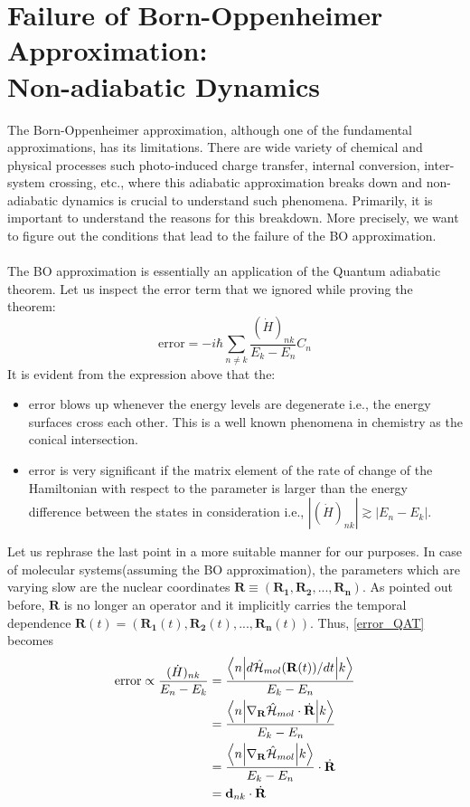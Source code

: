 \section{Failure of Born-Oppenheimer Approximation: \\Non-adiabatic Dynamics}

The Born-Oppenheimer approximation, although one of the fundamental approximations, has its limitations. There are wide variety of chemical and physical processes such photo-induced charge transfer, internal conversion, inter-system crossing, etc., where this adiabatic approximation breaks down and non-adiabatic dynamics is crucial to understand such phenomena. Primarily, it is important to understand the reasons for this breakdown. More precisely, we want to figure out the conditions that lead to the failure of the BO approximation. \\ \\
The BO approximation is essentially an application of the Quantum adiabatic theorem. Let us inspect the error term that we ignored while proving the theorem: 
\begin{equation}\label{error_QAT}
    \text{error} = -i\hbar\sum_{n\neq k}\frac{(\Dot{H})_{nk}}{E_k-E_n}C_n
\end{equation}
It is evident from the expression above that the:
\begin{itemize}
    \item error blows up whenever the energy levels are degenerate i.e., the energy surfaces cross each other. This is a well known phenomena in chemistry as the conical intersection. 
    \item error is very significant if the matrix element of the rate of change of the Hamiltonian with respect to the parameter is larger than the energy difference between the states in consideration i.e., $|(\Dot{H})_{nk}| \gtrsim |E_n - E_k|$. 
\end{itemize}
Let us rephrase the last point in a more suitable manner for our purposes. In case of molecular systems(assuming the BO approximation), the parameters which are varying slow are the nuclear coordinates $\mathbf{R}\equiv (\mathbf{R_1},\mathbf{R_2},...,\mathbf{R_n})$. As pointed out before, $\mathbf{R}$ is no longer an operator and it implicitly carries the temporal dependence $\mathbf{R}(t) = (\mathbf{R_1}(t),\mathbf{R_2}(t),...,\mathbf{R_n}(t))$. Thus, \eqref{error_QAT} becomes
\begin{align}
    \text{error} \propto \frac{(\Dot{H})_{nk}}{E_n-E_k} &= \frac{\mel**{n}{d\mathcal{\hat{H}}_{mol}(\mathbf{R}(t))/{dt}}{k}}{E_k - E_n} \\
    &= \frac{\mel**{n}{\nabla_{\mathbf{R}}\mathcal{\hat{H}}_{mol}\cdot \dot{\mathbf{R}}}{k}}{E_k - E_n} \\
    &= \frac{\mel**{n}{\nabla_{\mathbf{R}}\mathcal{\hat{H}}_{mol}}{k}}{E_k - E_n}\cdot \dot{\mathbf{R}} \\ 
    &= \mathbf{d}_{nk} \cdot \dot{\mathbf{R}}
\end{align}
